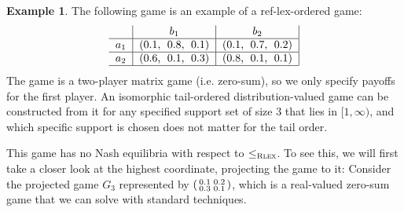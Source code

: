 \documentclass[a4paper]{scrreprt}
\theoremstyle{definition}
\newtheorem{ex}[thm]{Example} %
\begin{document}
    \newcommand{\Gproj}[1]{G_{#1}}
    \newcommand{\Gprojsub}[1]{\bar{G}_{#1}}
    
    \begin{ex}
        \label{ex:reflectedLexicographicallyOrderedGameWithoutEquilibria}
        The following game is an example of a ref-lex-ordered game:
        \begin{gather}
            \centering
            \begin{tabular}{c|c|c|}
            	      &        $b_1$        &        $b_2$        \\ \hline
            	$a_1$ & (0.1,\; 0.8,\; 0.1) & (0.1,\; 0.7,\; 0.2) \\ \hline
            	$a_2$ & (0.6,\; 0.1,\; 0.3) & (0.8,\; 0.1,\; 0.1) \\ \hline
            \end{tabular}
        \end{gather}
        The game is a two-player matrix game (i.e. zero-sum), so we only specify payoffs for the first player.
        An isomorphic tail-ordered distribution-valued game can be constructed from it for any specified support set of size 3 that lies in $[1, \infty)$,
        and which specific support is chosen does not matter for the tail order.
        
        This game has no Nash equilibria with respect to $\leq_{\textsc{Rlex}}$.
        To see this, we will first take a closer look at the highest coordinate, projecting the game to it: Consider the projected game
        $\Gproj{3}$ represented by $\left(\begin{smallmatrix}0.1 & 0.2 \\ 0.3 & 0.1\end{smallmatrix}\right)$, which is a real-valued zero-sum game that we can solve with standard techniques.
        

\end{ex}
\end{document}
